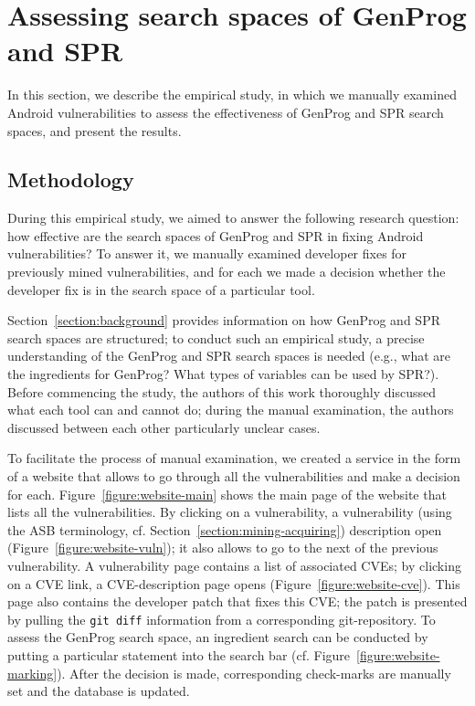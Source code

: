 \section{Assessing search spaces of GenProg and SPR}

In this section, we describe the empirical study, in which we manually examined \numvuln Android vulnerabilities to assess the effectiveness of GenProg and SPR search spaces, and present the results.

\subsection{Methodology}

During this empirical study, we aimed to answer the following research question: how effective are the search spaces of GenProg and SPR in fixing Android vulnerabilities?
To answer it, we manually examined developer fixes for \numvuln previously mined vulnerabilities, and for each we made a decision whether the developer fix is in the search space of a particular tool.

Section~\ref{section:background} provides information on how GenProg and SPR search spaces are structured; to conduct such an empirical study, a precise understanding of the GenProg and SPR search spaces is needed (e.g., what are the ingredients for GenProg? What types of variables can be used by SPR?). Before commencing the study, the authors of this work thoroughly discussed what each tool can and cannot do; during the manual examination, the authors discussed between each other particularly unclear cases.

To facilitate the process of manual examination, we created a service in the form of a website that allows to go through all the vulnerabilities and make a decision for each.
Figure~\ref{figure:website-main} shows the main page of the website that lists all the vulnerabilities.
By clicking on a vulnerability, a vulnerability (using the ASB terminology, cf. Section~\ref{section:mining-acquiring}) description open (Figure~\ref{figure:website-vuln}); it also allows to go to the next of the previous vulnerability.
A vulnerability page contains a list of associated CVEs; by clicking on a CVE link, a CVE-description page opens (Figure~\ref{figure:website-cve}).
This page also contains the developer patch that fixes this CVE; the patch is presented by pulling the \texttt{git diff} information from a corresponding git-repository.
To assess the GenProg search space, an ingredient search can be conducted by putting a particular statement into the search bar (cf. Figure~\ref{figure:website-marking}).
After the decision is made, corresponding check-marks are manually set and the database is updated.

